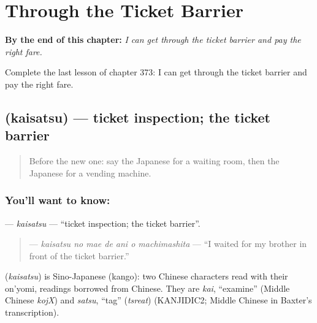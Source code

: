 
\chapter{Through the Ticket Barrier}
\label{ch:ja-through-the-ticket-barrier}

\begin{chapteropening}
\textbf{By the end of this chapter:} \emph{I can get through the ticket barrier and pay the right fare.}

Complete the last lesson of chapter 373: I can get through the ticket barrier and pay the right fare.
\end{chapteropening}

\section[\texorpdfstring{\ja{かいさつ} (kaisatsu)}{かいさつ (kaisatsu)}]{ (kaisatsu) — ticket inspection; the ticket barrier}

\label{lesson:JA-C373-kaisatsu}



\begin{quote}
Before the new one: say the Japanese for a waiting room, then the Japanese for a vending machine.
\end{quote}

\subsection*{You'll want to know: }
\textbf{} — \emph{kaisatsu} — \textquotedblleft{}ticket inspection; the ticket barrier\textquotedblright{}.

\begin{quote}
\textbf{   } — \emph{kaisatsu no mae de ani o machimashita} — \textquotedblleft{}I waited for my brother in front of the ticket barrier.\textquotedblright{}
\end{quote}

\begin{cousinweb}
\textbf{} (\emph{kaisatsu}) is Sino-Japanese (kango): two Chinese characters read with their on'yomi, readings borrowed from Chinese. They are \emph{kai}, \textquotedblleft{}examine\textquotedblright{} (Middle Chinese \emph{kojX}) and \emph{satsu}, \textquotedblleft{}tag\textquotedblright{} (\emph{tsreat}) (KANJIDIC2; Middle Chinese in Baxter's transcription).
\end{cousinweb}

